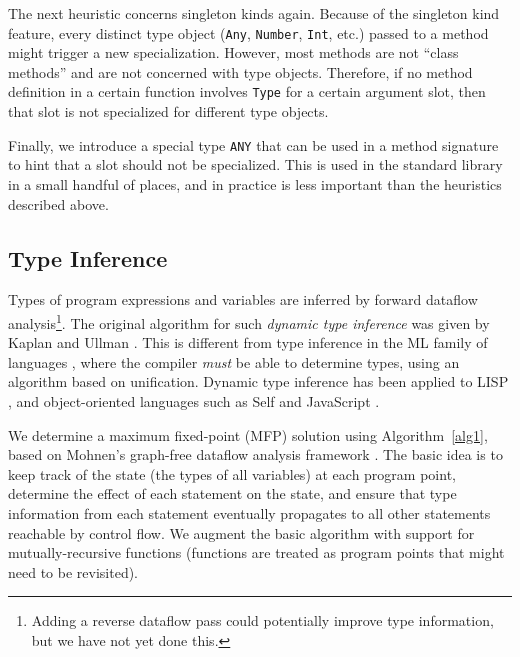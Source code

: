 \documentclass[9pt]{sigplanconf}
\begin{document}
The next heuristic concerns singleton kinds again. Because of the singleton
kind feature, every distinct type object ({\tt Any}, {\tt Number}, {\tt Int},
etc.) passed to a method might trigger a new specialization. However, most
methods are not ``class methods'' and are not concerned with type objects.
Therefore, if no method definition in a certain function involves {\tt Type}
for a certain argument slot, then that slot is not specialized for different
type objects.

Finally, we introduce a special type {\tt ANY} that can be used in a method
signature to hint that a slot should not be specialized. This is used in the
standard library in a small handful of places, and in practice is less
important than the heuristics described above.


\subsection{Type Inference}

Types of program expressions and variables are inferred by forward
dataflow analysis\footnote{Adding a reverse dataflow pass could potentially
improve type information, but we have not yet done this.}.
The original algorithm for such {\it dynamic type inference} was given by
Kaplan and Ullman \cite{kaplanullman}.
This is different from type inference in the ML family of languages
\cite{MLtypeinf}, where the compiler \emph{must} be able to determine
types, using an algorithm based on unification. Dynamic type inference
has been applied to LISP \cite{TICL} \cite{pticl} \cite{nimble},
and object-oriented languages such as Self \cite{selflang} and
JavaScript \cite{typeinfjavascript}.

We determine a maximum fixed-point (MFP) solution using
Algorithm~\ref{alg1}, based on
Mohnen's graph-free dataflow analysis framework \cite{graphfree}. The basic
idea is to keep track of the state (the types of all variables) at each program
point, determine the effect of each statement on the state, and ensure that
type information from each statement eventually propagates to all other
statements reachable by control flow. We augment the basic algorithm with
support for mutually-recursive functions
(functions are treated as program points that might need to be revisited).

\end{document}
